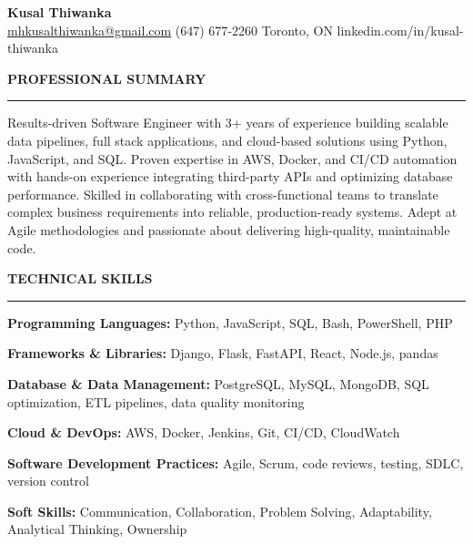\documentclass[10pt,letterpaper]{article}
\begin{document}
\begin{center}
{\LARGE\textbf{Kusal Thiwanka}}\\[3pt]
\href{mailto:mhkusalthiwanka@gmail.com}{mhkusalthiwanka@gmail.com}\hspace{2em}%
(647) 677{-}2260\hspace{2em}%
Toronto, ON\hspace{2em}
linkedin.com/in/kusal-thiwanka
\end{center}

\vspace{6pt}

\textbf{PROFESSIONAL SUMMARY}\\[-8pt]
\noindent\rule{\textwidth}{1pt}

\vspace{-2pt}

Results-driven Software Engineer with 3+ years of experience building scalable data pipelines, full stack applications, and cloud-based solutions using Python, JavaScript, and SQL. Proven expertise in AWS, Docker, and CI/CD automation with hands-on experience integrating third-party APIs and optimizing database performance. Skilled in collaborating with cross-functional teams to translate complex business requirements into reliable, production-ready systems. Adept at Agile methodologies and passionate about delivering high-quality, maintainable code.

\vspace{8pt}

\textbf{TECHNICAL SKILLS}\\[-8pt]
\noindent\rule{\textwidth}{1pt}

\vspace{-2pt}

\textbf{Programming Languages:} Python, JavaScript, SQL, Bash, PowerShell, PHP

\textbf{Frameworks \& Libraries:} Django, Flask, FastAPI, React, Node.js, pandas

\textbf{Database \& Data Management:} PostgreSQL, MySQL, MongoDB, SQL optimization, ETL pipelines, data quality monitoring

\textbf{Cloud \& DevOps:} AWS, Docker, Jenkins, Git, CI/CD, CloudWatch

\textbf{Software Development Practices:} Agile, Scrum, code reviews, testing, SDLC, version control

\textbf{Soft Skills:} Communication, Collaboration, Problem Solving, Adaptability, Analytical Thinking, Ownership
\end{document}
